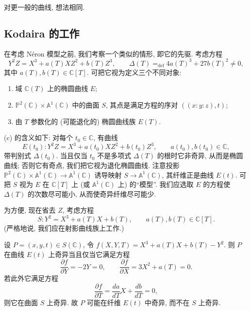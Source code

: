 对更一般的曲线, 想法相同.

\subsection*{Kodaira 的工作}

在考虑 N\'eron 模型之前, 我们考察一个类似的情形, 即它的先驱. 考虑方程
\[
Y^2Z = X^3 + a(T)XZ^2 + b(T)Z^3, \qquad
\Delta(T) \mathrel{=_{\mathrm{def}}} 4a(T)^3 + 27b(T)^2\neq 0,
\]
其中 $a(T), b(T)\in\mathbb{C}[T]$. 可把它视为定义三个不同对象:
\begin{enumerate}[label=\textup{(\alph*)}]
\item 域 $\mathbb{C}(T)$ 上的椭圆曲线 $E$;
\item $\mathbb{P}^2(\mathbb{C})\times\mathbb{A}^1(\mathbb{C})$ 中的曲面 $S$, 其点是满足方程的序对 $((x:y:z), t)$;
\item 由 $T$ 参数化的 (可能退化的) 椭圆曲线族 $E(T)$.
\end{enumerate}
(c) 的含义如下: 对每个 $t_0\in\mathbb{C}$, 有曲线
\[
E(t_0)\colon Y^2Z = X^3 + a(t_0)XZ^2 + b(t_0)Z^3, \qquad a(t_0), b(t_0)\in\mathbb{C},
\]
带判别式 $\Delta(t_0)$. 当且仅当 $t_0$ 不是多项式 $\Delta(T)$ 的根时它非奇异, 从而是椭圆曲线; 否则它有奇点, 我们把它视为退化椭圆曲线. 注意投影 $\mathbb{P}^2(\mathbb{C})\times\mathbb{A}^1(\mathbb{C})\to\mathbb{A}^1(\mathbb{C})$ 诱导映射 $S\to\mathbb{A}^1(\mathbb{C})$, 其纤维正是曲线 $E(t)$. 可把 $S$ 视为 $E$ 在 $\mathbb{C}[T]$ 上 (或 $\mathbb{A}^1(\mathbb{C})$ 上) 的``模型''. 我们应选取 $E$ 的方程使 $\Delta(T)$ 的次数尽可能小, 从而使奇异纤维尽可能少.

为方便, 现在省去 $Z$, 考虑方程
\[
S\colon Y^2 = X^3 + a(T)X + b(T), \qquad a(T), b(T)\in\mathbb{C}[T].
\]
(严格地说, 我们应在射影曲线族上工作.)

设 $P = (x,y,t)\in S(\mathbb{C})$, 令 $f(X,Y,T) = X^3 + a(T)X + b(T) - Y^2$. 则 $P$ 在曲线 $E(t)$ 上奇异当且仅当它满足方程
\[
\frac{\partial f}{\partial Y} = -2Y = 0, \qquad
\frac{\partial f}{\partial X} = 3X^2 + a(T) = 0.
\]
若此外它满足方程
\[
\frac{\partial f}{\partial T} = \frac{da}{dT}X + \frac{db}{dT} = 0,
\]
则它在曲面 $S$ 上奇异. 故 $P$ 可能在纤维 $E(t)$ 中奇异, 而不在 $S$ 上奇异.

